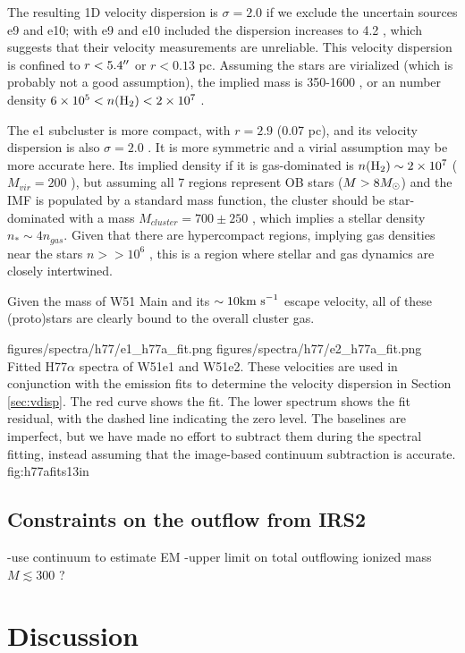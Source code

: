 The resulting 1D velocity dispersion is $\sigma=2.0$ \kms if we exclude
the uncertain sources e9
and e10; with e9 and e10 included the dispersion increases to 4.2 \kms, which
suggests that their velocity
measurements  are unreliable.  This velocity dispersion is confined to
$r<5.4\mbox{$^{\prime\prime}$}$ or $r<0.13$ pc.  Assuming the stars are virialized (which is
probably not a good assumption), the implied mass is 350-1600 \msun, or an \hh
number density $6\times10^{5} < n(\textrm{H}_{2}) < 2\times10^{7}$ \percc.

The e1 subcluster is more compact, with $r=2.9$ \arcsec (0.07 pc), and its
velocity dispersion is also $\sigma=2.0$ \kms.  It is more symmetric and a virial
assumption may be more accurate here.  Its implied density if it is gas-dominated
is $n(\textrm{H}_{2})\sim2\times10^{7}$ \percc ($M_{vir}=200$ \msun), but assuming all 7 \hchii
regions represent OB stars ($M>8M_{\odot}$) and the IMF is populated by a standard
\citet{Kroupa2001a} mass function, the cluster should be star-dominated with a
mass $M_{cluster}=700\pm250$ \msun, which implies a stellar density $n_* \sim 4
n_{gas}$.  Given that there are hypercompact \hii regions, implying gas
densities near the stars $n>>10^6$ \percc, this is a region where stellar and
gas dynamics are closely intertwined.

Given the mass of W51 Main and its $\sim10\textrm{km~s}^{-1}$ escape velocity, all of these
(proto)stars are clearly bound to the overall cluster gas. 

\FigureTwo
{figures/spectra/h77/e1_h77a_fit.png}
{figures/spectra/h77/e2_h77a_fit.png}
{Fitted H77$\alpha$ spectra of W51e1 and W51e2.  These velocities are used in
conjunction with the \formaldehyde emission fits to determine the velocity
dispersion in Section \ref{sec:vdisp}.
The red curve shows the fit.  The lower spectrum shows the fit residual, with
the dashed line indicating the zero level.  The baselines are imperfect, but we
have made no effort to subtract them during the spectral fitting, instead
assuming that the image-based continuum subtraction is accurate.
}
{fig:h77afits}{1}{3in}

\subsection{Constraints on the outflow from IRS2}
-use continuum to estimate EM
-upper limit on total outflowing ionized mass $M\lesssim300$ \msun?

\section{Discussion}
\label{sec:discussion}

